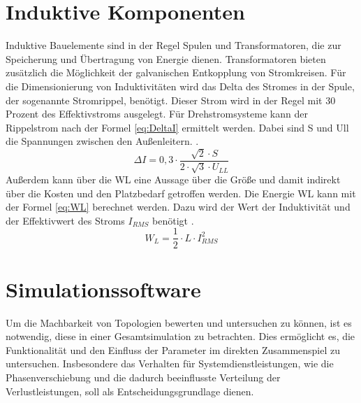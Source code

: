 \section{Induktive Komponenten}
	Induktive Bauelemente sind in der Regel Spulen und Transformatoren, die zur Speicherung und Übertragung von Energie dienen. Transformatoren bieten zusätzlich die Möglichkeit der galvanischen Entkopplung von Stromkreisen. 
	Für die Dimensionierung von Induktivitäten wird das Delta des Stromes in der Spule, der sogenannte Stromrippel, benötigt. Dieser Strom wird in der Regel mit 30 Prozent des Effektivstroms ausgelegt. Für Drehstromsysteme kann der Rippelstrom nach der Formel \ref{eq:DeltaI} ermittelt werden. Dabei sind \gls{S} und \gls{Ull} die Spannungen zwischen den Außenleitern. \cite{Boge.2007}.\\
	\begin{equation}
		\label{eq:DeltaI}
		 \Delta I = 0,3 \cdot \dfrac{\sqrt{2} \cdot S}{2 \cdot \sqrt{3} \cdot U_{LL}}
	\end{equation}
	Außerdem kann über die \gls{WL} eine Aussage über die Größe und damit indirekt über die Kosten und den Platzbedarf getroffen werden. Die Energie \gls{WL} kann mit der Formel \ref{eq:WL} berechnet werden. Dazu wird der Wert der Induktivität und der Effektivwert des Stroms $I_{RMS}$ benötigt \cite{Boge.2007}.
	\begin{equation}
		\label{eq:WL}
		W_{L} =\dfrac{1}{2}\cdot L\cdot I_{RMS}^{2}
	\end{equation}
	



\section{Simulationssoftware}
	Um die Machbarkeit von Topologien bewerten und untersuchen zu können, ist es notwendig, diese in einer Gesamtsimulation zu betrachten. Dies ermöglicht es, die Funktionalität und den Einfluss der Parameter im direkten Zusammenspiel zu untersuchen. Insbesondere das Verhalten für Systemdienstleistungen, wie die Phasenverschiebung und die dadurch beeinflusste Verteilung der Verlustleistungen, soll als Entscheidungsgrundlage dienen.  

